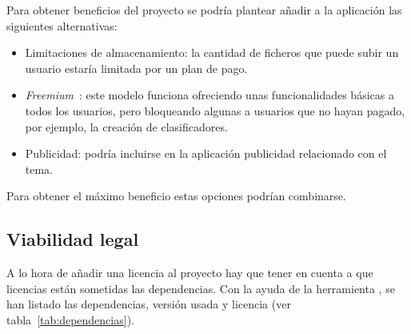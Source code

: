 Para obtener beneficios del proyecto se podría plantear añadir a la aplicación 
las siguientes alternativas:
\begin{itemize}
	\item Limitaciones de almacenamiento: la cantidad de ficheros que puede 
	subir un usuario estaría limitada por un plan de pago.
	\item \textit{Freemium}~\cite{wiki:freemium}: este modelo funciona 
	ofreciendo unas funcionalidades básicas a todos los usuarios, pero 
	bloqueando algunas a usuarios que no hayan pagado, por ejemplo, la creación 
	de clasificadores.
	\item Publicidad: podría incluirse en la aplicación publicidad relacionado 
	con el tema.
\end{itemize}

Para obtener el máximo beneficio estas opciones podrían combinarse.

\subsection{Viabilidad legal}

A lo hora de añadir una licencia al proyecto hay que tener en cuenta a que 
licencias están sometidas las dependencias. Con la ayuda de la herramienta 
, se han listado las 
dependencias, versión usada y licencia (ver tabla~\ref{tab:dependencias}).

